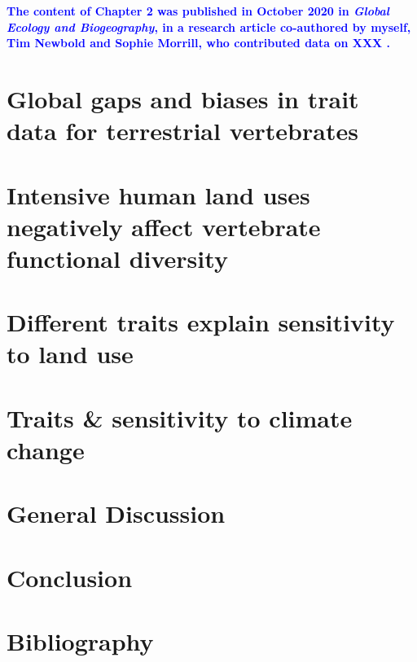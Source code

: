 \documentclass[11pt]{report}
\renewcommand{\baselinestretch}{1.5}
\begin{document}
\begin{refsection}
\textcolor{blue}{\textbf{The content of Chapter 2 was published in October 2020 in \textit{Global Ecology and Biogeography}, in a research article co-authored by myself, Tim Newbold and Sophie Morrill, who contributed data on XXX \citep{Etard2020}.}}

\chapter{Global gaps and biases in trait data for terrestrial vertebrates}



\chapter{Intensive human land uses negatively affect vertebrate functional diversity}


\chapter{Different traits explain sensitivity to land use}
%

\chapter{Traits \& sensitivity to climate change}
%

\chapter{General Discussion}



\chapter{Conclusion}


\clearpage
{}
\chapter*{Bibliography}
\renewcommand{\baselinestretch}{1}
\printbibliography[heading=none]

\end{refsection}
\end{document}
